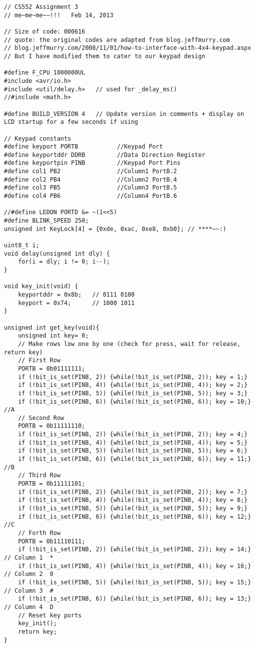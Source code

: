 \documentclass[12pt]{book}
\begin{document}
\lstset{language=java,label= ,caption= ,numbers=none}
\begin{lstlisting}
// CS552 Assignment 3
// me~me~me~~!!!   Feb 14, 2013

// Size of code: 000616
// quote: the original codes are adapted from blog.jeffmurry.com
// blog.jeffmurry.com/2008/11/01/how-to-interface-with-4x4-keypad.aspx
// But I have modified them to cater to our keypad design

#define F_CPU 1000000UL 
#include <avr/io.h>
#include <util/delay.h>   // used for _delay_ms()
//#include <math.h>

#define BUILD_VERSION 4   // Update version in comments + display on LCD startup for a few seconds if using

// Keypad constants
#define keyport PORTB           //Keypad Port
#define keyportddr DDRB         //Data Direction Register
#define keyportpin PINB         //Keypad Port Pins
#define col1 PB2                //Column1 PortB.2
#define col2 PB4                //Column2 PortB.4
#define col3 PB5                //Column3 PortB.5
#define col4 PB6                //Column4 PortB.6

//#define LEDON PORTD &= ~(1<<5)
#define BLINK_SPEED 250;
unsigned int KeyLock[4] = {0xde, 0xac, 0xe8, 0xb0}; // ****~~:)

uint8_t i;
void delay(unsigned int dly) {
    for(i = dly; i != 0; i--);
}

void key_init(void) {
    keyportddr = 0x8b;   // 0111 0100
    keyport = 0x74;      // 1000 1011
}

unsigned int get_key(void){
    unsigned int key= 0;
    // Make rows low one by one (check for press, wait for release, return key)
    // First Row
    PORTB = 0b01111111;
    if (!bit_is_set(PINB, 2)) {while(!bit_is_set(PINB, 2)); key = 1;}
    if (!bit_is_set(PINB, 4)) {while(!bit_is_set(PINB, 4)); key = 2;}
    if (!bit_is_set(PINB, 5)) {while(!bit_is_set(PINB, 5)); key = 3;}
    if (!bit_is_set(PINB, 6)) {while(!bit_is_set(PINB, 6)); key = 10;} //A
    // Second Row
    PORTB = 0b11111110;
    if (!bit_is_set(PINB, 2)) {while(!bit_is_set(PINB, 2)); key = 4;}
    if (!bit_is_set(PINB, 4)) {while(!bit_is_set(PINB, 4)); key = 5;}
    if (!bit_is_set(PINB, 5)) {while(!bit_is_set(PINB, 5)); key = 6;}
    if (!bit_is_set(PINB, 6)) {while(!bit_is_set(PINB, 6)); key = 11;} //B
    // Third Row
    PORTB = 0b11111101;
    if (!bit_is_set(PINB, 2)) {while(!bit_is_set(PINB, 2)); key = 7;}
    if (!bit_is_set(PINB, 4)) {while(!bit_is_set(PINB, 4)); key = 8;}
    if (!bit_is_set(PINB, 5)) {while(!bit_is_set(PINB, 5)); key = 9;}
    if (!bit_is_set(PINB, 6)) {while(!bit_is_set(PINB, 6)); key = 12;} //C
    // Forth Row
    PORTB = 0b11110111;
    if (!bit_is_set(PINB, 2)) {while(!bit_is_set(PINB, 2)); key = 14;} // Column 1  *
    if (!bit_is_set(PINB, 4)) {while(!bit_is_set(PINB, 4)); key = 16;} // Column 2  0
    if (!bit_is_set(PINB, 5)) {while(!bit_is_set(PINB, 5)); key = 15;} // Column 3  #
    if (!bit_is_set(PINB, 6)) {while(!bit_is_set(PINB, 6)); key = 13;} // Column 4  D
    // Reset key ports
    key_init();
    return key;
}


\end{lstlisting}
\end{document}

